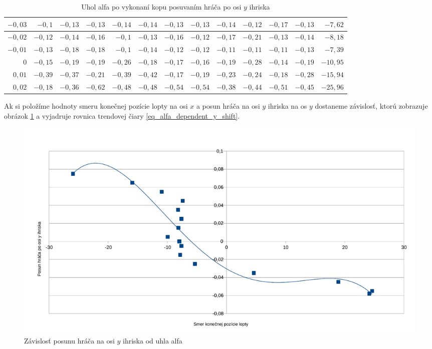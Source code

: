\begin{table}[H]
\begin{tabu}{||r||r|r|r|r|r|r|r|r|r|r||r|r||}
  \hline
 $-0,03$ & $-0,1$ & $-0,13$ & $-0,13$ & $-0,14$ & $-0,14$ & $-0,13$ & $-0,13$ & $-0,14$ & $-0,12$ & $-0,17$ & $-0,13$ & $-7,62$ \\
  \hline
 $-0,02$ & $-0,12$ & $-0,14$ & $-0,16$ & $-0,1$ & $-0,13$ & $-0,16$ & $-0,12$ & $-0,17$ & $-0,21$ & $-0,13$ & $-0,14$ & $-8,18$ \\
  \hline
 $-0,01$ & $-0,13$ & $-0,18$ & $-0,18$ & $-0,1$ & $-0,14$ & $-0,12$ & $-0,12$ & $-0,11$ & $-0,11$ & $-0,11$ & $-0,13$ & $-7,39$\\
  \hline
 $0$ & $-0,15$ & $-0,19$ & $-0,19$ & $-0,26$ & $-0,18$ & $-0,17$ & $-0,16$ & $-0,19$ & $-0,28$ & $-0,14$ & $-0,19$ & $-10,95$ \\
  \hline
 $0,01$ & $-0,39$ & $-0,37$ & $-0,21$ & $-0,39$ & $-0,42$ & $-0,17$ & $-0,19$ & $-0,23$ & $-0,24$ & $-0,18$ & $-0,28$ & $-15,94$ \\
  \hline
 $0,02$ & $-0,18$ & $-0,36$ & $-0,62$ & $-0,48$ & $-0,48$ & $-0,54$ & $-0,54$ & $-0,38$ & $-0,44$ & $-0,51$ & $-0,45$ & $-25,96$\\
 \hline
 \hline
\end{tabu}
	\caption{Uhol alfa po vykonaní kopu posuvaním hráča po osi $y$ ihriska}
	\label{tab_alpha}
\end{table}

Ak si položíme hodnoty smeru konečnej pozície lopty na osi $x$ a posun hráča na osi $y$ ihriska na os $y$ dostaneme závislosť, ktorú zobrazuje obrázok \ref{pic_alfa_dependent_y_shift} a vyjadruje rovnica trendovej čiary \ref{eq_alfa_dependent_y_shift}. 

\begin{figure}[H]
	\centering
	\includegraphics[scale=0.5]{./data/alfa_dependent_y_shift}
	\caption{Závislosť posunu hráča na osi $y$ ihriska od uhla alfa}
	\label{pic_alfa_dependent_y_shift}
\end{figure}

